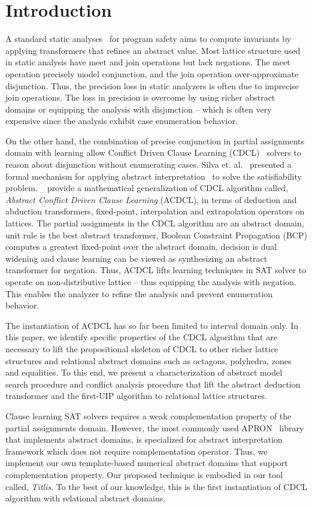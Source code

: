 \section{Introduction}
%
A standard static analyses~\cite{se2011} for program safety aims to compute 
invariants by applying transformers that refines an abstract 
value.  Most lattice structure used in static analysis have 
meet and join operations but lack negations.  The meet operation 
precisely model conjunction, and the join operation over-approximate 
disjunction. Thus, the precision loss in static analyzers is often 
due to imprecise join operations. The loss in precision is overcome 
by using richer abstract domains or equipping the analysis with disjunction --
which is often very expensive since the analysis exhibit case enumeration 
behavior. 


On the other hand, the combination of precise conjunction in partial assignments 
domain with learning allow Conflict Driven Clause Learning (CDCL)~\cite{cdcl} 
solvers to reason about disjunction without enumerating cases.  
Silva et. al.~\cite{tacas12, sas12, dhk2013-popl} presented 
a formal mechanism for applying abstract interpretation~\cite{se2011} to solve the 
satisfiability problem.  ~\cite{sas12} provide a mathematical generalization 
of CDCL algorithm called, {\em Abstract Conflict Driven Clause Learning} (ACDCL), 
in terms of deduction and abduction transformers, fixed-point, interpolation 
and extrapolation operators on lattices.  The partial assignments in the 
CDCL algorithm are an abstract domain, unit rule is the best abstract 
transformer,  Boolean Constraint Propagation (BCP) computes a greatest fixed-point 
over the abstract domain, decision is dual widening and clause learning can be 
viewed as synthesizing an abstract transformer for negation.  Thus, ACDCL 
lifts learning techniques in SAT solver to operate on non-distributive 
lattice -- thus equipping the analysis with negation. This enables the 
analyzer to refine the analysis and prevent enumeration behavior.

The instantiation of ACDCL has so far been limited to interval domain only.  In this paper, 
we identify specific properties of the CDCL algorithm that are necessary to 
lift the propositional skeleton of CDCL to other richer lattice structures 
and relational abstract domains such as octagons, polyhedra, zones and equalities.  
To this end, we present a characterization of abstract model search procedure and 
conflict analysis procedure that lift the abstract deduction transformer and the 
first-UIP algorithm to relational lattice structures. 

Clause learning SAT solvers requires a weak complementation property 
of the partial assignments domain.  However,  the most commonly 
used APRON~\cite{apron} library that implements abstract domains, is specialized 
for abstract interpretation framework which does not require complementation 
operator.  Thus, we implement our own template-based numerical abstract 
domains that support complementation property.  Our proposed technique 
is embodied in our tool called, {\em Titlis}.  To the best of our 
knowledge, this is the first instantiation of CDCL 
algorithm with relational abstract domains. 
 
